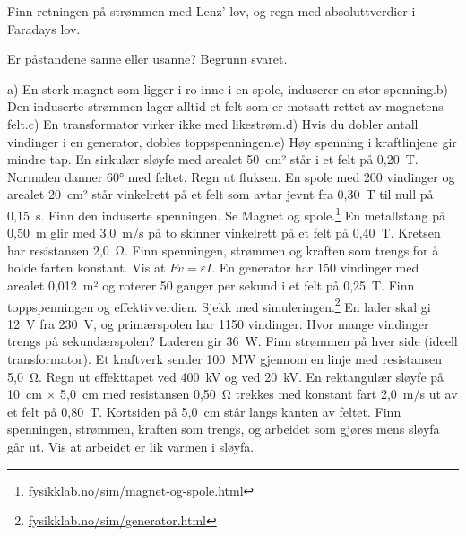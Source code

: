 \documentclass[11pt]{article}
\begin{document}
Finn retningen på strømmen med Lenz' lov, og regn med absoluttverdier i Faradays lov.

\begin{oppgaveliste}
\oppgave {}Er påstandene sanne eller usanne? Begrunn svaret.

a) En sterk magnet som ligger i ro inne i en spole, induserer en stor spenning.\newline b) Den induserte strømmen lager alltid et felt som er motsatt rettet av magnetens felt.\newline c) En transformator virker ikke med likestrøm.\newline d) Hvis du dobler antall vindinger i en generator, dobles toppspenningen.\newline e) Høy spenning i kraftlinjene gir mindre tap.
\svar
\oppgave {}En sirkulær sløyfe med arealet 50~cm² står i et felt på 0,20~T. Normalen danner 60° med feltet. Regn ut fluksen.
\svar
\oppgave {}En spole med 200 vindinger og arealet 20~cm² står vinkelrett på et felt som avtar jevnt fra 0,30~T til null på 0,15~s. Finn den induserte spenningen. Se Magnet og spole.\footnote{\url{fysikklab.no/sim/magnet-og-spole.html}}
\svar
\oppgave {}En metallstang på 0,50~m glir med 3,0~m/s på to skinner vinkelrett på et felt på 0,40~T. Kretsen har resistansen 2,0~Ω. Finn spenningen, strømmen og kraften som trengs for å holde farten konstant. Vis at $Fv = εI$.
\svar
\oppgave {}En generator har 150 vindinger med arealet 0,012~m² og roterer 50 ganger per sekund i et felt på 0,25~T. Finn toppspenningen og effektivverdien. Sjekk med simuleringen.\footnote{\url{fysikklab.no/sim/generator.html}}
\svar
\oppgave {}En lader skal gi 12~V fra 230~V, og primærspolen har 1150 vindinger. Hvor mange vindinger trengs på sekundærspolen? Laderen gir 36~W. Finn strømmen på hver side (ideell transformator).
\svar
\oppgave {}Et kraftverk sender 100~MW gjennom en linje med resistansen 5,0~Ω. Regn ut effekttapet ved 400~kV og ved 20~kV.
\svar
\oppgave {}En rektangulær sløyfe på 10~cm × 5,0~cm med resistansen 0,50~Ω trekkes med konstant fart 2,0~m/s ut av et felt på 0,80~T. Kortsiden på 5,0~cm står langs kanten av feltet. Finn spenningen, strømmen, kraften som trengs, og arbeidet som gjøres mens sløyfa går ut. Vis at arbeidet er lik varmen i sløyfa.
\svar
\end{oppgaveliste}
\end{document}
